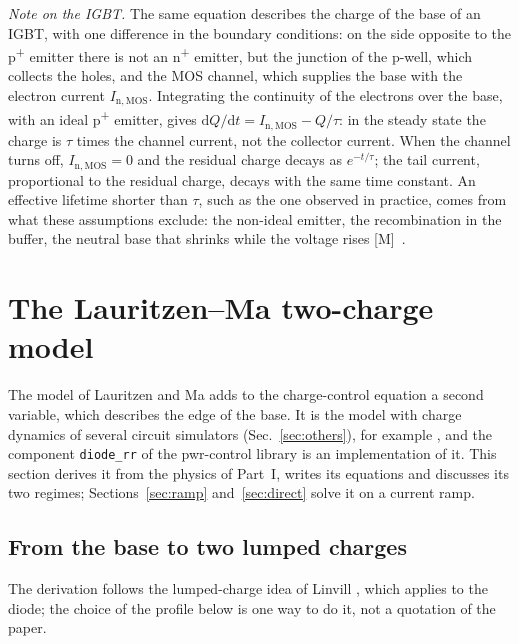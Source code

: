 \documentclass[10pt,a4paper]{scrartcl}
\newcommand{\diff}{\mathrm{d}}
\newcommand{\Pp}{p\textsuperscript{+}}
\newcommand{\Np}{n\textsuperscript{+}}
\begin{document}
\emph{Note on the IGBT.} The same equation describes the charge of the base of an IGBT, with one difference in the boundary conditions: on the side opposite to the \Pp{} emitter there is not an \Np{} emitter, but the junction of the p-well, which collects the holes, and the MOS channel, which supplies the base with the electron current $I_\mathrm{n,MOS}$. Integrating the continuity of the electrons over the base, with an ideal \Pp{} emitter, gives $\diff Q/\diff t = I_\mathrm{n,MOS} - Q/\tau$: in the steady state the charge is $\tau$ times the channel current, not the collector current. When the channel turns off, $I_\mathrm{n,MOS} = 0$ and the residual charge decays as $e^{-t/\tau}$; the tail current, proportional to the residual charge, decays with the same time constant. An effective lifetime shorter than $\tau$, such as the one observed in practice, comes from what these assumptions exclude: the non-ideal emitter, the recombination in the buffer, the neutral base that shrinks while the voltage rises [M]~\cite{baliga}.
\section{The Lauritzen--Ma two-charge model}
\label{sec:model}
The model of Lauritzen and Ma \cite{lauritzen1991} adds to the charge-control equation a second variable, which describes the edge of the base. It is the model with charge dynamics of several circuit simulators (Sec.~\ref{sec:others}), for example \cite{mathworks}, and the component \texttt{diode\_rr} of the pwr-control library is an implementation of it. This section derives it from the physics of Part~I, writes its equations and discusses its two regimes; Sections~\ref{sec:ramp} and~\ref{sec:direct} solve it on a current ramp.

\subsection{From the base to two lumped charges}
\label{sec:lumped}
The derivation follows the lumped-charge idea of Linvill \cite{linvill1958}, which \cite{lauritzen1991} applies to the diode; the choice of the profile below is one way to do it, not a quotation of the paper.
\end{document}
